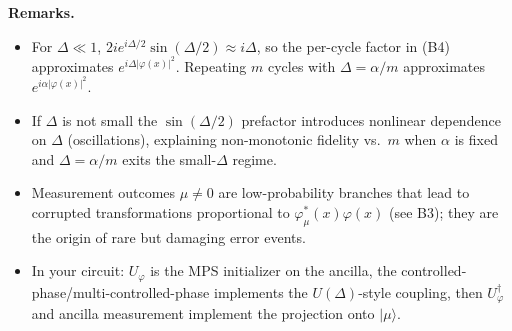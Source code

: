 \documentclass[12pt,a4paper]{article}
\begin{document}
\bigskip
\textbf{Remarks.}
\begin{itemize}
  \item For \(\Delta\ll1\), \(2i e^{i\Delta/2}\sin(\Delta/2)\approx i\Delta\), so the per-cycle factor in (B4) approximates \(e^{i\Delta|\varphi(x)|^2}\). Repeating \(m\) cycles with \(\Delta=\alpha/m\) approximates \(e^{i\alpha|\varphi(x)|^2}\).
  \item If \(\Delta\) is not small the \(\sin(\Delta/2)\) prefactor introduces nonlinear dependence on \(\Delta\) (oscillations), explaining non-monotonic fidelity vs.\ \(m\) when \(\alpha\) is fixed and \(\Delta=\alpha/m\) exits the small-\(\Delta\) regime.
  \item Measurement outcomes \(\mu\neq0\) are low-probability branches that lead to corrupted transformations proportional to \(\varphi_\mu^*(x)\varphi(x)\) (see B3); they are the origin of rare but damaging error events.
  \item In your circuit: \(U_\varphi\) is the MPS initializer on the ancilla, the controlled-phase/multi-controlled-phase implements the \(U(\Delta)\)-style coupling, then \(U_\varphi^\dagger\) and ancilla measurement implement the projection onto \(|\mu\rangle\).
\end{itemize}
\end{document}
